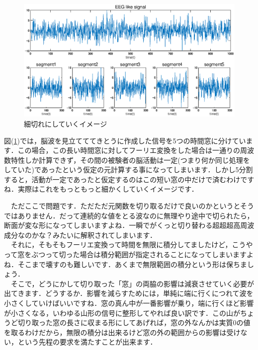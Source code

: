 \documentclass[11pt,a4paper]{ujreport} 	%
\begin{document}
\begin{figure}[H]
  \label{im:dft1}
  \centering
  \includegraphics[width=15cm]{../figures/dft1.eps}
  \caption{細切れにしていくイメージ}
\end{figure}


図(\ref{im:dft1})では，脳波を見立てててきとうに作成した信号を5つの時間窓に分けています．この場合，この長い時間窓に対してフーリエ変換をした場合は一通りの周波数特性しか計算できず，その間の被験者の脳活動は一定(つまり何か同じ処理をしていた)であったという仮定の元計算する事になってしまいます．しかし5分割すると，活動が一定であったと仮定するのはこの短い窓の中だけで済むわけですね．実際はこれをもっともっと細かくしていくイメージです．

　ただここで問題です．ただただ元関数を切り取るだけで良いのかというとそうではありません．だって連続的な値をとる波なのに無理やり途中で切られたら，断面が変な形になってしまいますよね．一瞬でがくっと切り替わる超超超高周波成分なのかな？みたいに解釈されてしまいます．\\
　それに，そもそもフーリエ変換って時間を無限に積分してましたけど，こうやって窓をぶつって切った場合は積分範囲が指定されることになってしまいますよね．そこまで壊すのも難しいです．あくまで無限範囲の積分という形は保ちましょう．
\\
　そこで，どうにかして切り取った「窓」の両脇の影響は減衰させていく必要が出てきます．どうするか．影響を減らすためには，単純に端に行くにつれて波を小さくしていけばいいですね．窓の真ん中が一番影響が乗り，端に行くほど影響が小さくなる，いわゆる山形の信号に整形してやれば良い訳です．この山がちょうど切り取った窓の長さに収まる形にしてあげれば，窓の外なんかは実質0の値を取るわけだから，無限の積分は出来るけど窓の外の範囲からの影響は受けない，という先程の要求を満たすことが出来ます．\\
\end{document}
